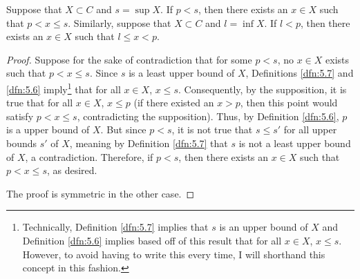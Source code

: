 \documentclass[../main.tex]{subfiles}
\begin{document}
\begin{lemma}\label{lem:5.11}
    Suppose that $X\subset C$ and $s=\sup X$. If $p<s$, then there exists an $x\in X$ such that $p<x\leq s$. Similarly, suppose that $X\subset C$ and $l=\inf X$. If $l<p$, then there exists an $x\in X$ such that $l\leq x<p$.
    \begin{proof}
        Suppose for the sake of contradiction that for some $p<s$, no $x\in X$ exists such that $p<x\leq s$. Since $s$ is a least upper bound of $X$, Definitions \ref{dfn:5.7} and \ref{dfn:5.6} imply\footnote{Technically, Definition \ref{dfn:5.7} implies that $s$ is an upper bound of $X$ and Definition \ref{dfn:5.6} implies based off of this result that for all $x\in X$, $x\leq s$. However, to avoid having to write this every time, I will shorthand this concept in this fashion.} that for all $x\in X$, $x\leq s$. Consequently, by the supposition, it is true that for all $x\in X$, $x\leq p$ (if there existed an $x>p$, then this point would satisfy $p<x\leq s$, contradicting the supposition). Thus, by Definition \ref{dfn:5.6}, $p$ is a upper bound of $X$. But since $p<s$, it is not true that $s\leq s'$ for all upper bounds $s'$ of $X$, meaning by Definition \ref{dfn:5.7} that $s$ is not a least upper bound of $X$, a contradiction. Therefore, if $p<s$, then there exists an $x\in X$ such that $p<x\leq s$, as desired.\par
        The proof is symmetric in the other case.
    \end{proof}
\end{lemma}
\end{document}
